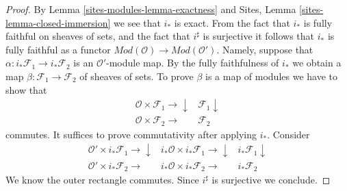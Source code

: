 \begin{proof}
By Lemma \ref{sites-modules-lemma-exactness} and
Sites, Lemma \ref{sites-lemma-closed-immersion}
we see that $i_*$ is exact. From the fact that
$i_*$ is fully faithful on sheaves of sets, and the fact that
$i^\sharp$ is surjective it follows that $i_*$ is fully faithful
as a functor $\textit{Mod}(\mathcal{O}) \to \textit{Mod}(\mathcal{O}')$.
Namely, suppose that $\alpha : i_*\mathcal{F}_1 \to i_*\mathcal{F}_2$
is an $\mathcal{O}'$-module map. By the fully faithfulness of $i_*$
we obtain a map $\beta : \mathcal{F}_1 \to \mathcal{F}_2$ of sheaves
of sets. To prove $\beta$ is a map of modules we have to show
that
$$
\begin{array}{cc}\mathcal{O} \times \mathcal{F}_1 \longrightarrow\downarrow & \mathcal{F}_1 \downarrow \\ \mathcal{O} \times \mathcal{F}_2 \longrightarrow & \mathcal{F}_2\end{array}
$$
commutes. It suffices to prove commutativity after applying $i_*$.
Consider
$$
\begin{array}{ccc}\mathcal{O}' \times i_*\mathcal{F}_1 \longrightarrow\downarrow & i_*\mathcal{O} \times i_*\mathcal{F}_1 \longrightarrow\downarrow & i_*\mathcal{F}_1 \downarrow \\ \mathcal{O}' \times i_*\mathcal{F}_2 \longrightarrow & i_*\mathcal{O} \times i_*\mathcal{F}_2 \longrightarrow & i_*\mathcal{F}_2\end{array}
$$
We know the outer rectangle commutes. Since $i^\sharp$ is surjective
we conclude.


\end{proof}

